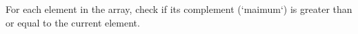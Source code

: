\documentclass[preview]{standalone}
\begin{document}
For each element in the array, check if its complement (`maimum`) is greater than or equal to the current element.\\
\end{document}

